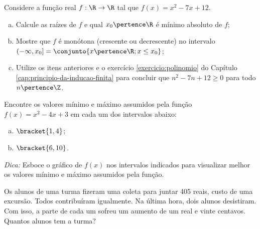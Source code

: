 \begin{exercise}
  Considere a função real $f : \R \to \R$ tal que $f(x) = x^2 -7x +12$.
  \begin{enumerate}[a)]
    \item Calcule as raízes de $f$ e qual $x_0 \pertence \R$ é mínimo absoluto de $f$;
    \item Mostre que $f$ é monótona (crescente ou decrescente) no intervalo $\left( - \infty , x_0 \right] = \conjunto{x \pertence \R; x \leq x_0 }$;
    \item Utilize os itens anteriores e o exercício \ref{exercicio:polinomio} do Capítulo \ref{cap:principio-da-inducao-finita} para concluir que $n^2 - 7n +12 \geq 0$ para todo $n \pertence \Z$.
  \end{enumerate}
\end{exercise}

\begin{exercise}
    Encontre os valores mínimo e máximo assumidos pela função $f(x)
= x^2 -4x +3$ em cada um dos intervalos abaixo:
\begin{enumerate}[a)]
  \item $\bracket{1, 4}$;
  \item $\bracket{6, 10}$.
\end{enumerate}
\emph{Dica:} Esboce o gráfico de $f(x)$ nos intervalos indicados
para visualizar melhor os valores mínimo e máximo assumidos pela
função.
\end{exercise}

\begin{exercise}
    Os alunos de uma turma fizeram uma coleta para juntar 405 reais,
custo de uma excursão. Todos contribuíram igualmente. Na última
hora, dois alunos desistiram. Com isso, a parte de cada um sofreu um
aumento de um real e vinte centavos. Quantos alunos tem a turma?
\end{exercise}

